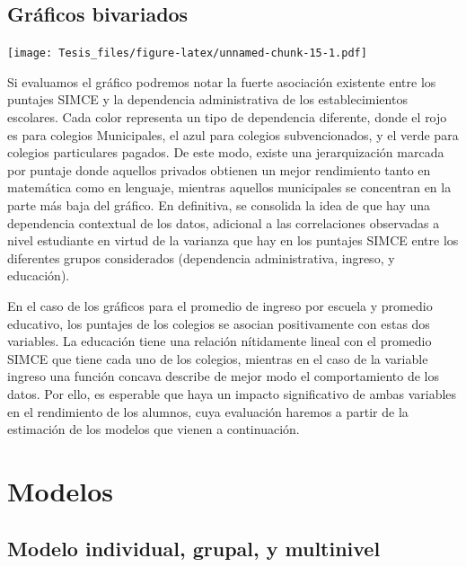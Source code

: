 \documentclass[
]{article}
\begin{document}
\hypertarget{gruxe1ficos-bivariados}{%
\subsection{Gráficos bivariados}\label{gruxe1ficos-bivariados}}

\texttt{[image: Tesis\_files/figure-latex/unnamed-chunk-15-1.pdf]}

Si evaluamos el gráfico podremos notar la fuerte asociación existente
entre los puntajes SIMCE y la dependencia administrativa de los
establecimientos escolares. Cada color representa un tipo de dependencia
diferente, donde el rojo es para colegios Municipales, el azul para
colegios subvencionados, y el verde para colegios particulares pagados.
De este modo, existe una jerarquización marcada por puntaje donde
aquellos privados obtienen un mejor rendimiento tanto en matemática como
en lenguaje, mientras aquellos municipales se concentran en la parte más
baja del gráfico. En definitiva, se consolida la idea de que hay una
dependencia contextual de los datos, adicional a las correlaciones
observadas a nivel estudiante en virtud de la varianza que hay en los
puntajes SIMCE entre los diferentes grupos considerados (dependencia
administrativa, ingreso, y educación).

En el caso de los gráficos para el promedio de ingreso por escuela y
promedio educativo, los puntajes de los colegios se asocian
positivamente con estas dos variables. La educación tiene una relación
nítidamente lineal con el promedio SIMCE que tiene cada uno de los
colegios, mientras en el caso de la variable ingreso una función concava
describe de mejor modo el comportamiento de los datos. Por ello, es
esperable que haya un impacto significativo de ambas variables en el
rendimiento de los alumnos, cuya evaluación haremos a partir de la
estimación de los modelos que vienen a continuación.

\hypertarget{modelos}{%
\section{Modelos}\label{modelos}}

\hypertarget{modelo-individual-grupal-y-multinivel}{%
\subsection{Modelo individual, grupal, y
multinivel}\label{modelo-individual-grupal-y-multinivel}}

\usepackage{graphicx}
\end{document}
